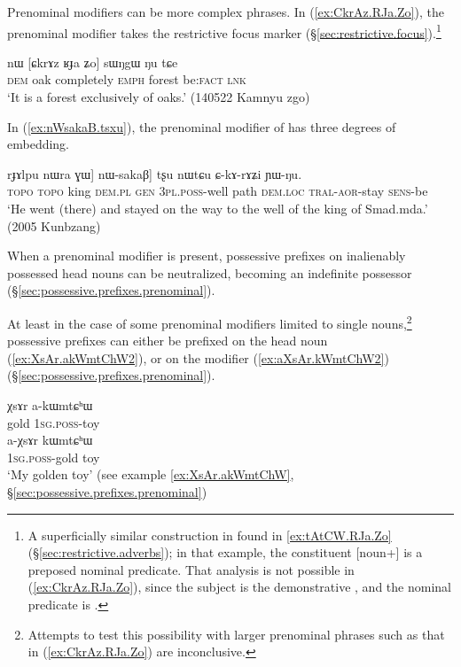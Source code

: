 Prenominal modifiers can be more complex phrases. In (\ref{ex:CkrAz.RJa.Zo}), the prenominal modifier  takes the restrictive focus marker   (§\ref{sec:restrictive.focus}).\footnote{A superficially similar construction in found in \ref{ex:tAtCW.RJa.Zo} (§\ref{sec:restrictive.adverbs}); in that example, the constituent [noun+] is a preposed nominal predicate. That analysis is not possible in (\ref{ex:CkrAz.RJa.Zo}), since the subject is the demonstrative , and the nominal predicate is . } 
 
\begin{exe}
\ex \label{ex:CkrAz.RJa.Zo}
 \gll nɯ [ɕkrɤz ʁɟa ʑo] sɯŋgɯ ŋu tɕe \\
 \textsc{dem} oak completely \textsc{emph} forest be:\textsc{fact} \textsc{lnk} \\
 \glt `It is a forest exclusively of oaks.' (140522 Kamnyu zgo)
\end{exe}

In (\ref{ex:nWsakaB.tsxu}), the prenominal modifier of  has three degrees of embedding.

\begin{exe}
\ex \label{ex:nWsakaB.tsxu}
\gll [[[smɤt tɯmda] rɟɤlpu nɯra ɣɯ] nɯ-sakaβ] tʂu nɯtɕu ɕ-kɤ-rɤʑi ɲɯ-ŋu. \\
\textsc{topo}  \textsc{topo} king \textsc{dem}.\textsc{pl} \textsc{gen} \textsc{3pl}.\textsc{poss}-well path \textsc{dem}.\textsc{loc} \textsc{tral}-\textsc{aor}-stay \textsc{sens}-be \\
\glt `He went (there) and stayed on the way to the well of the king of Smad.mda.' (2005 Kunbzang)
\end{exe}

When a prenominal modifier is present, possessive prefixes on inalienably possessed head nouns can be neutralized, becoming an indefinite possessor  (§\ref{sec:possessive.prefixes.prenominal}). 

At least in the case of some prenominal modifiers limited to single nouns,\footnote{Attempts to test this possibility with larger prenominal phrases such as that in (\ref{ex:CkrAz.RJa.Zo}) are inconclusive. } possessive prefixes can either be prefixed on the head noun (\ref{ex:XsAr.akWmtChW2}), or on the modifier (\ref{ex:aXsAr.kWmtChW2}) (§\ref{sec:possessive.prefixes.prenominal}).

\begin{exe}
\ex \label{ex:XsAr.kWmtChW}
\begin{xlist}
\ex \label{ex:XsAr.akWmtChW2}
\gll χsɤr a-kɯmtɕʰɯ \\
gold \textsc{1sg}.\textsc{poss}-toy \\
\ex \label{ex:aXsAr.kWmtChW2}
\gll a-χsɤr kɯmtɕʰɯ \\
\textsc{1sg}.\textsc{poss}-gold toy  \\
\glt `My golden toy' (see example \ref{ex:XsAr.akWmtChW}, §\ref{sec:possessive.prefixes.prenominal})
\end{xlist}
\end{exe}

